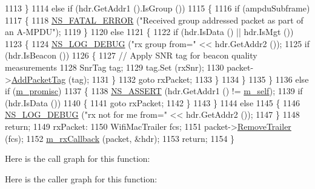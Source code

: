 \begin{DoxyCode}
1113     \}
1114   \textcolor{keywordflow}{else} \textcolor{keywordflow}{if} (hdr.GetAddr1 ().IsGroup ())
1115     \{
1116       \textcolor{keywordflow}{if} (ampduSubframe)
1117         \{
1118           \hyperlink{group__fatal_ga5131d5e3f75d7d4cbfd706ac456fdc85}{NS\_FATAL\_ERROR} (\textcolor{stringliteral}{"Received group addressed packet as part of an A-MPDU"});
1119         \}
1120       \textcolor{keywordflow}{else}
1121         \{
1122           \textcolor{keywordflow}{if} (hdr.IsData () || hdr.IsMgt ())
1123             \{
1124               \hyperlink{group__logging_ga413f1886406d49f59a6a0a89b77b4d0a}{NS\_LOG\_DEBUG} (\textcolor{stringliteral}{"rx group from="} << hdr.GetAddr2 ());
1125               \textcolor{keywordflow}{if} (hdr.IsBeacon ())
1126                 \{
1127                   \textcolor{comment}{// Apply SNR tag for beacon quality measurements}
1128                   SnrTag tag;
1129                   tag.Set (rxSnr);
1130                   packet->\hyperlink{classns3_1_1Packet_a7400b8655852f5271c5957250d0141af}{AddPacketTag} (tag);
1131                 \}
1132               \textcolor{keywordflow}{goto} rxPacket;
1133             \}
1134         \}
1135     \}
1136   \textcolor{keywordflow}{else} \textcolor{keywordflow}{if} (\hyperlink{classns3_1_1MacLow_ad13beb74b1519291ee00d14f1d532fdb}{m\_promisc})
1137     \{
1138       \hyperlink{assert_8h_a6dccdb0de9b252f60088ce281c49d052}{NS\_ASSERT} (hdr.GetAddr1 () != \hyperlink{classns3_1_1MacLow_a23004ca5405c82111f5b20eec03b3d9a}{m\_self});
1139       \textcolor{keywordflow}{if} (hdr.IsData ())
1140         \{
1141           \textcolor{keywordflow}{goto} rxPacket;
1142         \}
1143     \}
1144   \textcolor{keywordflow}{else}
1145     \{
1146       \hyperlink{group__logging_ga413f1886406d49f59a6a0a89b77b4d0a}{NS\_LOG\_DEBUG} (\textcolor{stringliteral}{"rx not for me from="} << hdr.GetAddr2 ());
1147     \}
1148   \textcolor{keywordflow}{return};
1149 rxPacket:
1150   WifiMacTrailer fcs;
1151   packet->\hyperlink{classns3_1_1Packet_a2155e042083e9a17ad3b33f9fecb4be4}{RemoveTrailer} (fcs);
1152   \hyperlink{classns3_1_1MacLow_ac5f2b06b6151c99816c66b7bf946a4d8}{m\_rxCallback} (packet, &hdr);
1153   \textcolor{keywordflow}{return};
1154 \}
\end{DoxyCode}


Here is the call graph for this function\+:




Here is the caller graph for this function\+:


